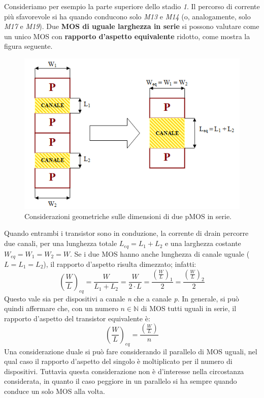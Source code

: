 Consideriamo per esempio la parte superiore dello stadio \textit{1}. Il percorso di corrente più sfavorevole si ha quando conducono solo \textit{M13} e \textit{M14} (o, analogamente, solo \textit{M17} e \textit{M19}). Due \textbf{MOS di uguale larghezza in serie} si possono valutare come un unico MOS con \textbf{rapporto d'aspetto equivalente} ridotto, come mostra la figura seguente.

\begin{figure}[hbt!]
	\centering
	\includegraphics{figure/PMOS_series.png}
	\caption{Considerazioni geometriche sulle dimensioni di due pMOS in serie.}
	\label{fig:PMOS_series}
\end{figure}

Quando entrambi i transistor sono in conduzione, la corrente di drain percorre due canali, per una lunghezza totale $L_{eq} = L_1 + L_2$ e una larghezza costante $W_{eq} = W_1 = W_2 = W$. Se i due MOS hanno anche lunghezza di canale uguale ($L=L_1 = L_2$), il rapporto d'aspetto risulta dimezzato; infatti:
\begin{equation}
	\left ( \frac{W}{L} \right ) _{eq} = \frac{W}{L_1 + L_2} = \frac{W}{2 \cdot L} =  \frac{\left ( \frac{W}{L} \right ) _{1}}{2} = \frac{\left ( \frac{W}{L} \right ) _{2}}{2} 
\end{equation}
Questo vale sia per dispositivi a canale \textit{n} che a canale \textit{p}.
In generale, si può quindi affermare che, con un numero $n \in  \mathbb{N}$ di MOS tutti uguali in serie, il rapporto d'aspetto del transistor equivalente è:
\begin{equation}
\left ( \frac{W}{L} \right ) _{eq} = \frac{\left ( \frac{W}{L} \right )}{n} 
\end{equation}
Una considerazione duale si può fare considerando il parallelo di MOS uguali, nel qual caso il rapporto d'aspetto del singolo è moltiplicato per il numero di dispositivi. Tuttavia questa considerazione non è d'interesse nella circostanza considerata, in quanto il caso peggiore in un parallelo si ha sempre quando conduce un solo MOS alla volta.

